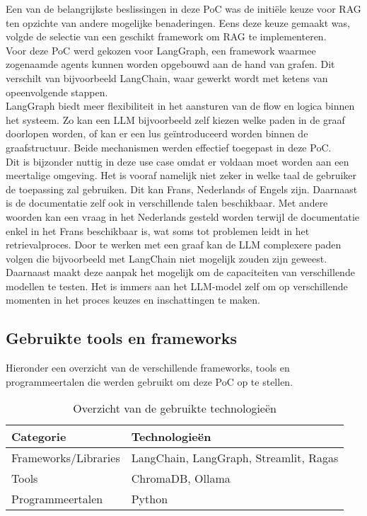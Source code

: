 Een van de belangrijkste beslissingen in deze PoC was de initiële keuze voor RAG ten opzichte van andere mogelijke benaderingen. Eens deze keuze gemaakt was, volgde de selectie van een geschikt framework om RAG te implementeren.
\\[1em]
Voor deze PoC werd gekozen voor LangGraph, een framework waarmee zogenaamde agents kunnen worden opgebouwd aan de hand van grafen. Dit verschilt van bijvoorbeeld LangChain, waar gewerkt wordt met ketens van opeenvolgende stappen.
\\[1em]
LangGraph biedt meer flexibiliteit in het aansturen van de flow en logica binnen het systeem. Zo kan een LLM bijvoorbeeld zelf kiezen welke paden in de graaf doorlopen worden, of kan er een lus geïntroduceerd worden binnen de graafstructuur. Beide mechanismen werden effectief toegepast in deze PoC.
\\[1em]
Dit is bijzonder nuttig in deze use case omdat er voldaan moet worden aan een meertalige omgeving. Het is vooraf namelijk niet zeker in welke taal de gebruiker de toepassing zal gebruiken. Dit kan Frans, Nederlands of Engels zijn. Daarnaast is de documentatie zelf ook in verschillende talen beschikbaar. Met andere woorden kan een vraag in het Nederlands gesteld worden terwijl de documentatie enkel in het Frans beschikbaar is, wat soms tot problemen leidt in het retrievalproces. Door te werken met een graaf kan de LLM complexere paden volgen die bijvoorbeeld met LangChain niet mogelijk zouden zijn geweest.
\\[1em]
Daarnaast maakt deze aanpak het mogelijk om de capaciteiten van verschillende modellen te testen. Het is immers aan het LLM-model zelf om op verschillende momenten in het proces keuzes en inschattingen te maken.

\subsection{Gebruikte tools en frameworks}
Hieronder een overzicht van de verschillende frameworks, tools en programmeertalen die werden gebruikt om deze PoC op te stellen.

\begin{table}[H]
    \begin{tabular}{|l|l|}
        \hline
        \textbf{Categorie}       & \textbf{Technologieën}               \\ \hline
        Frameworks/Libraries     & LangChain, LangGraph, Streamlit, Ragas \\ \hline
        Tools                   & ChromaDB, Ollama                    \\ \hline
        Programmeertalen        & Python                             \\ \hline
    \end{tabular}
    \caption{Overzicht van de gebruikte technologieën}
\end{table}

